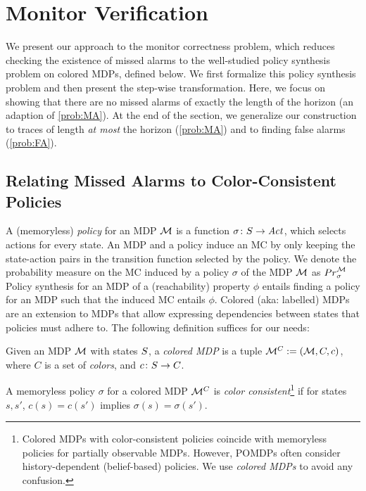 \documentclass[runningheads]{llncs}
\newcommand{\defeq}{:=}
\begin{document}
\section{Monitor Verification}
\label{sec:monver}
We present our approach to the monitor correctness problem, which reduces checking the existence of missed alarms to the well-studied policy synthesis problem on colored MDPs, defined below. We first formalize this  policy synthesis problem and then present the step-wise transformation. Here, we focus on showing that there are no missed alarms  of exactly the length of the horizon (an adaption of \cref{prob:MA}). At the end of the section, we generalize our construction to traces of length \emph{at most} the horizon (\cref{prob:MA}) and to
finding false alarms (\cref{prob:FA}).

\subsection{Relating Missed Alarms to Color-Consistent Policies}
\label{sec:overview}\label{ssec:maintheorem}
A (memoryless) \emph{policy} for an MDP $\mathcal{M}$ is a function $\sigma\colon S \to \mathit{Act}$, which selects actions for every state.
An MDP and a policy induce an MC by only keeping the state-action pairs in the transition function selected by the policy.
We denote the probability measure on the MC induced by a policy $\sigma$ of the MDP $\mathcal{M}$ as ${Pr}^{\mathcal{M}}_{\sigma}$
Policy synthesis for an MDP of a (reachability) property $\phi$ entails finding a policy for an MDP such that the induced MC entails $\phi$. Colored (aka: labelled) MDPs~\cite{DBLP:journals/jair/AndriushchenkoCMJK25} are an extension to MDPs that allow expressing dependencies between states that policies must adhere to. The following definition suffices for our needs:
\begin{definition}\label{def:colMDP}
    Given an MDP $\mathcal{M}$ with states $S$, a \emph{colored MDP} is a tuple $\mdpc \defeq (\mdp, C, c)$, where $C$ is a set of \emph{colors}, and $c\colon S \to C$. %
\end{definition}
\begin{definition}
    \label{def:colconsistent}
    A memoryless policy $\sigma$ for a colored MDP $\mathcal{M}^{C}$ is \emph{color consistent}\footnote{Colored MDPs with color-consistent policies coincide with memoryless policies for partially observable MDPs. However, POMDPs often consider history-dependent (belief-based) policies. We use \emph{colored MDPs} to avoid any confusion.} if for states $s, s'$,
    $c(s) = c(s')$ implies $\sigma(s) = \sigma(s')$.
\end{definition}
\end{document}
